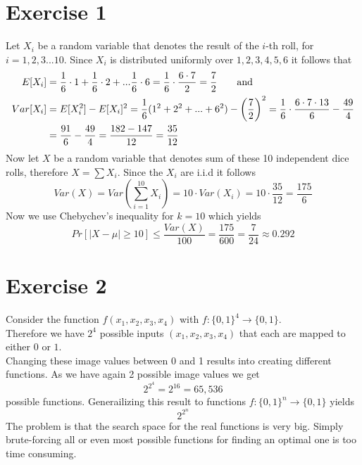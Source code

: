 \documentclass[12pt]{article}
\begin{document}
\section*{Exercise 1}

Let $X_i$ be a random variable that denotes the result of the $i$-th roll, for $i=1,2,3...10$. Since $X_i$ is distributed uniformly over $1,2,3,4,5,6$ it follows that 
\begin{align*}
	E[X_i] &= \frac{1}{6}\cdot 1 + \frac{1}{6}\cdot 2 + ... \frac{1}{6}\cdot 6 = \frac{1}{6}\cdot \frac{6 \cdot 7}{2} = \frac{7}{2} \text{\qquad and} \\
	Var[X_i] &= E[X_i^2] - E[X_i]^2 = \frac{1}{6}(1^2 + 2^2 + ... + 6^2) - \left( \frac{7}{2} \right)^2 = \frac{1}{6} \cdot \frac{6 \cdot 7 \cdot 13}{6} - \frac{49}{4} \\
	&= \frac{91}{6} - \frac{49}{4} = \frac{182 - 147}{12} = \frac{35}{12}
\end{align*}
Now let $X$ be a random variable that denotes sum of these 10 independent dice rolls, therefore $X = \sum X_i$. Since the $X_i$ are i.i.d it follows
\begin{equation*}
	Var(X) = Var(\sum_{i=1}^{10} X_i) = 10 \cdot Var(X_i) = 10 \cdot \frac{35}{12} = \frac{175}{6}
\end{equation*}
Now we use Chebychev's inequality for $k=10$ which yields
\begin{equation*}
	Pr[|X - \mu| \geq 10] \leq \frac{Var(X)}{100} = \frac{175}{600} = \frac{7}{24} \approx 0.292
\end{equation*}

\section*{Exercise 2}
Consider the function $f(x_1,x_2,x_3,x_4)$ with $f: \{0,1\}^4 \rightarrow \{0,1\}$. \\
Therefore we have $2^4$ possible inputs $(x_1,x_2,x_3,x_4)$ that each are mapped to either $0$ or $1$. \\
Changing these image values between 0 and 1 results into creating different functions. As we have again 2 possible image values we get
\begin{equation*}
	2^{2^4} = 2^{16} = 65,536
\end{equation*}
possible functions. Generailizing this result to functions  $f: \{0,1\}^n \rightarrow \{0,1\}$ yields
\begin{equation*}
	2^{2^n}
\end{equation*}
The problem is that the search space for the real functions is very big. Simply brute-forcing all or even most possible functions for finding an optimal one is too time consuming.
\end{document}
